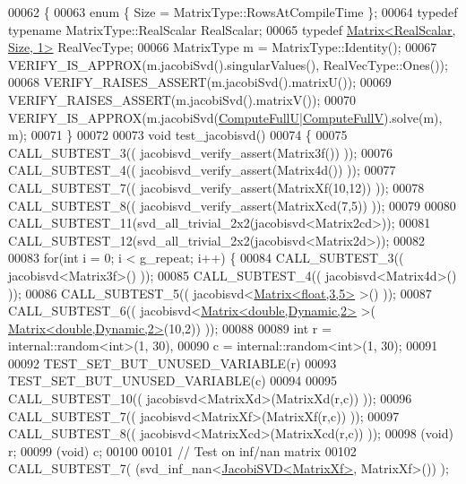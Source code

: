 \begin{DoxyCode}
00062 \{
00063   \textcolor{keyword}{enum} \{ Size = MatrixType::RowsAtCompileTime \};
00064   \textcolor{keyword}{typedef} \textcolor{keyword}{typename} MatrixType::RealScalar RealScalar;
00065   \textcolor{keyword}{typedef} \hyperlink{group___core___module_class_eigen_1_1_matrix}{Matrix<RealScalar, Size, 1>} RealVecType;
00066   MatrixType m = MatrixType::Identity();
00067   VERIFY\_IS\_APPROX(m.jacobiSvd().singularValues(), RealVecType::Ones());
00068   VERIFY\_RAISES\_ASSERT(m.jacobiSvd().matrixU());
00069   VERIFY\_RAISES\_ASSERT(m.jacobiSvd().matrixV());
00070   VERIFY\_IS\_APPROX(m.jacobiSvd(\hyperlink{group__enums_ggae3e239fb70022eb8747994cf5d68b4a9a2b4f91ca5859a4159dbfe8090043817f}{ComputeFullU}|\hyperlink{group__enums_ggae3e239fb70022eb8747994cf5d68b4a9a52c6f7e80bbf9a42297c88f700245b51}{ComputeFullV}).solve(m), m);
00071 \}
00072 
00073 \textcolor{keywordtype}{void} test\_jacobisvd()
00074 \{
00075   CALL\_SUBTEST\_3(( jacobisvd\_verify\_assert(Matrix3f()) ));
00076   CALL\_SUBTEST\_4(( jacobisvd\_verify\_assert(Matrix4d()) ));
00077   CALL\_SUBTEST\_7(( jacobisvd\_verify\_assert(MatrixXf(10,12)) ));
00078   CALL\_SUBTEST\_8(( jacobisvd\_verify\_assert(MatrixXcd(7,5)) ));
00079   
00080   CALL\_SUBTEST\_11(svd\_all\_trivial\_2x2(jacobisvd<Matrix2cd>));
00081   CALL\_SUBTEST\_12(svd\_all\_trivial\_2x2(jacobisvd<Matrix2d>));
00082 
00083   \textcolor{keywordflow}{for}(\textcolor{keywordtype}{int} i = 0; i < g\_repeat; i++) \{
00084     CALL\_SUBTEST\_3(( jacobisvd<Matrix3f>() ));
00085     CALL\_SUBTEST\_4(( jacobisvd<Matrix4d>() ));
00086     CALL\_SUBTEST\_5(( jacobisvd<\hyperlink{group___core___module_class_eigen_1_1_matrix}{Matrix<float,3,5>} >() ));
00087     CALL\_SUBTEST\_6(( jacobisvd<\hyperlink{group___core___module_class_eigen_1_1_matrix}{Matrix<double,Dynamic,2>} >(
      \hyperlink{group___core___module_class_eigen_1_1_matrix}{Matrix<double,Dynamic,2>}(10,2)) ));
00088 
00089     \textcolor{keywordtype}{int} r = internal::random<int>(1, 30),
00090         c = internal::random<int>(1, 30);
00091     
00092     TEST\_SET\_BUT\_UNUSED\_VARIABLE(r)
00093     TEST\_SET\_BUT\_UNUSED\_VARIABLE(c)
00094     
00095     CALL\_SUBTEST\_10(( jacobisvd<MatrixXd>(MatrixXd(r,c)) ));
00096     CALL\_SUBTEST\_7(( jacobisvd<MatrixXf>(MatrixXf(r,c)) ));
00097     CALL\_SUBTEST\_8(( jacobisvd<MatrixXcd>(MatrixXcd(r,c)) ));
00098     (void) r;
00099     (void) c;
00100 
00101     \textcolor{comment}{// Test on inf/nan matrix}
00102     CALL\_SUBTEST\_7(  (svd\_inf\_nan<\hyperlink{group___s_v_d___module_class_eigen_1_1_jacobi_s_v_d}{JacobiSVD<MatrixXf>}, MatrixXf>()) );

\end{DoxyCode}
